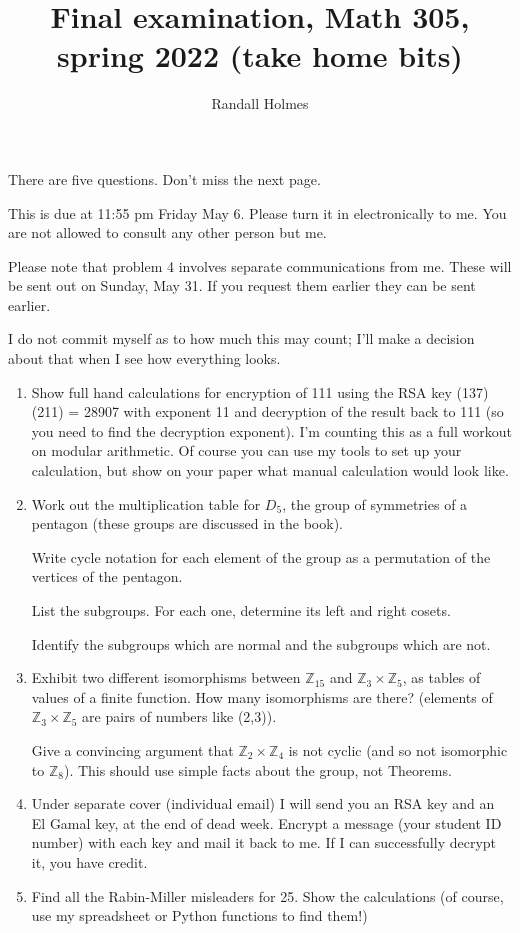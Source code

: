 \documentclass[12pt]{article}
\title{Final examination, Math 305, spring 2022 (take home bits)}
\author{Randall Holmes}
\begin{document}
\maketitle

There are five questions.  Don't miss the next page.

This is due at 11:55 pm Friday May 6.  Please turn it in electronically to me.  You are not allowed to consult any other person but me.

Please note that problem 4 involves separate communications from me.  These will be sent out on Sunday, May 31.  If you request them earlier they can be sent earlier.

I do not commit myself as to how much this may count;  I'll make a decision about that when I see how everything looks.

\begin{enumerate}

\item  Show full hand calculations for encryption of 111 using the RSA key (137)(211) = 28907 with exponent 11 and decryption of the result back to 111 (so you need to find the decryption exponent).  I'm counting this as a full workout on modular arithmetic.  Of course you can use my tools to set up your calculation, but show on your paper what manual calculation would look like.

\item  Work out the multiplication table for $D_5$, the group of symmetries of a pentagon (these groups are discussed in the book).

Write cycle notation for each element of the group as a permutation of the vertices of the pentagon.

List the subgroups.  For each one, determine its left and right cosets.

Identify the subgroups which are normal and the subgroups which are not.

\item  Exhibit two different isomorphisms between $\mathbb Z_{15}$ and $\mathbb Z_3 \times \mathbb Z_5$, as tables of values of a finite function.
How many isomorphisms are there?  (elements of $\mathbb Z_3 \times \mathbb Z_5$ are pairs of numbers like (2,3)).

Give a convincing argument that $\mathbb Z_2 \times \mathbb Z_4$ is not cyclic (and so not isomorphic to $\mathbb Z_8$).  This should use simple facts about the group, not Theorems.

\item  Under separate cover (individual email) I will send you an RSA key and an El Gamal key, at the end of dead week.  Encrypt a message (your student ID number) with each key
and mail it back to me.  If I can successfully decrypt it, you have credit.

\item  Find all the Rabin-Miller misleaders for 25.  Show the calculations (of course, use my spreadsheet or Python functions to find them!)

\end{enumerate}
\end{document}
